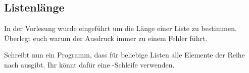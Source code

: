 \subsection{Listenlänge }

In der Vorlesung wurde  eingeführt um die Länge einer
Liste zu bestimmen. Überlegt euch warum der Ausdruck 
immer zu einem Fehler führt.

Schreibt nun ein Programm, dass für beliebige Listen alle Elemente der Reihe
nach ausgibt. Ihr könnt dafür eine -Schleife verwenden.
